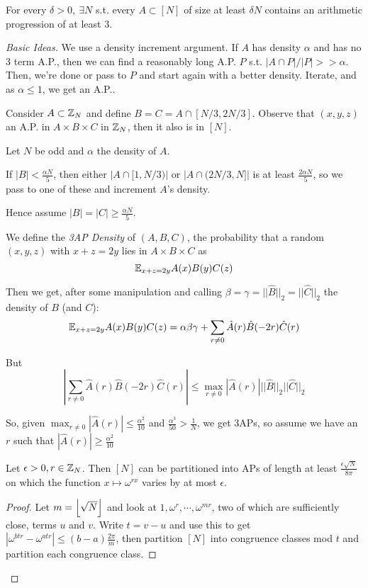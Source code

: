 \documentclass[a4paper]{article}
\begin{document}
{\begin{thm}[Roth]
	For every $\delta>0,\ \exists N$ s.t. every $A \subset[N]$ of size at least $\delta N$ contains an arithmetic progression of at least 3.
\end{thm}
\begin{proof}[Basic Ideas]
	We use a density increment argument. If $A$ has density $\alpha$ and has no 3 term A.P., then we can find a reasonably long A.P. $P$ s.t. $|A\cap P|/|P| >>\alpha$. Then, we're done or pass to $P$ and start again with a better density. Iterate, and as $\alpha \leq1$, we get an A.P..
	
	Consider $A\subset\mathbb{Z}_N$ and define $B=C=A\cap[N/3, 2N/3]$. Observe that $(x,y,z)$ an A.P. in $A\times B\times C$ in $\mathbb{Z}_N$, then it also is in $[N]$.
	
	Let $N$ be odd and $\alpha$ the density of $A$.
	
	If $|B|<\frac{\alpha N}{5}$, then either $\left|A\cap[1, N/3)\right|$ or $\left|A\cap(2N/3, N]\right|$ is at least $\frac{2\alpha N}{5}$, so we pass to one of these and increment $A$'s density.
	
	Hence assume $|B|=|C|\geq\frac{\alpha N}{5}$.
	
	We define the \emph{3AP Density} of $(A,B,C)$, the probability that a random $(x,y,z)$ with $x+z=2y$ lies in $A\times B\times C$ as $$\mathbb{E}_{x+z=2y}A(x)B(y)C(z)$$
	
	Then we get, after some manipulation and calling $\beta=\gamma=||\hat{B}||_2=||\hat{C}||_2$ the density of $B$ (and $C$):
	$$\mathbb{E}_{x+z=2y}A(x)B(y)C(z)=\alpha\beta\gamma + \sum_{r\neq0}\hat{A}(r)\hat{B}(-2r)\hat{C}(r)$$
	
	But 
	$$\left|\sum_{r\neq0}\hat{A}(r)\hat{B}(-2r)\hat{C}(r)\right|\leq\max_{r\neq0}\left|\hat{A}(r)\right|||\hat{B}||_2||\hat{C}||_2$$
	
	So, given $\max_{r\neq0}\left|\hat{A}(r)\right|\leq\frac{\alpha^2}{10}$ and $\frac{\alpha^3}{50}>\frac{1}{N}$, we get 3APs, so assume we have an $r$ such that $\left|\hat{A}(r)\right|\geq\frac{\alpha^2}{10}$
	
	\begin{lemma}
		Let $\epsilon>0, r\in\mathbb{Z}_N$. Then $[N]$ can be partitioned into APs of length at least $\frac{\epsilon\sqrt{N}}{8\pi}$ on which the function $x\mapsto\omega^{rx}$ varies by at most $\epsilon$.
	\end{lemma}
	\begin{proof}
	Let $m=\left\lfloor \sqrt{N} \right\rfloor$ and look at $1,\omega^{r},\cdots,\omega^{mr}$, two of which are sufficiently close, terms $u$ and $v$. Write $t=v-u$ and use this to get $\left|\omega^{btr}-\omega^{atr}\right|\leq(b-a)\frac{2\pi}{m}$, then partition $[N]$ into congruence classes mod $t$ and partition each congruence class.
	\end{proof}
	

\end{proof}}
\end{document}
